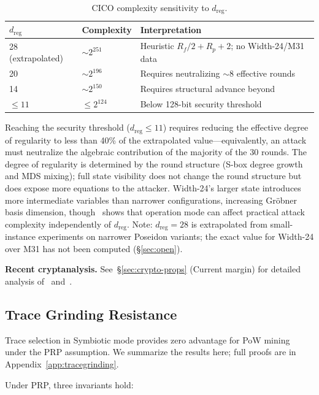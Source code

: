 \documentclass[11pt,a4paper]{article}
\begin{document}
\begin{table}[h]
\centering
\begin{tabular}{@{}lll@{}}
\toprule
$d_{\mathrm{reg}}$ & Complexity & Interpretation \\
\midrule
28 (extrapolated) & ${\sim}2^{251}$ & Heuristic $R_f/2 + R_p + 2$; no Width-24/M31 data \\
20 & ${\sim}2^{196}$ & Requires neutralizing ${\sim}8$ effective rounds \\
14 & ${\sim}2^{150}$ & Requires structural advance beyond~\cite{skipping2026} \\
$\leq 11$ & $\leq 2^{124}$ & Below 128-bit security threshold \\
\bottomrule
\end{tabular}
\caption{CICO complexity sensitivity to $d_{\mathrm{reg}}$.}
\label{tab:cico}
\end{table}

Reaching the security threshold ($d_{\mathrm{reg}} \leq 11$) requires reducing the effective degree of regularity to less than 40\% of the extrapolated value---equivalently, an attack must neutralize the algebraic contribution of the majority of the 30 rounds. The degree of regularity is determined by the round structure (S-box degree growth and MDS mixing); full state visibility does not change the round structure but does expose more equations to the attacker. Width-24's larger state introduces more intermediate variables than narrower configurations, increasing Gr\"obner basis dimension, though~\cite{skipping2026} shows that operation mode can affect practical attack complexity independently of $d_{\mathrm{reg}}$. Note: $d_{\mathrm{reg}} = 28$ is extrapolated from small-instance experiments on narrower Poseidon variants; the exact value for Width-24 over M31 has not been computed (\S\ref{sec:open}).

\textbf{Recent cryptanalysis.} See~\S\ref{sec:crypto-props} (Current margin) for detailed analysis of~\cite{skipping2026} and~\cite{resultant2026}.

\subsection{Trace Grinding Resistance}
\label{sec:tracegrind}

Trace selection in Symbiotic mode provides zero advantage for PoW mining under the PRP assumption. We summarize the results here; full proofs are in Appendix~\ref{app:tracegrinding}.

Under PRP, three invariants hold:
\end{document}
